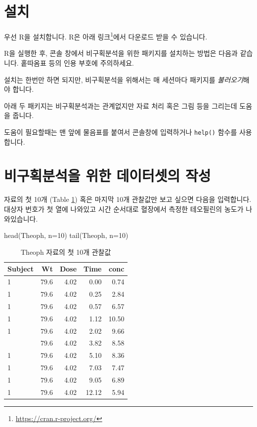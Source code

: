 \documentclass[
  11pt,
  krantz2, a4paper, twoside]{krantz}
\newenvironment{Shaded}{\begin{snugshade}}{\end{snugshade}}
\newcommand{\AttributeTok}[1]{\textcolor[rgb]{0.77,0.63,0.00}{#1}}
\newcommand{\DecValTok}[1]{\textcolor[rgb]{0.00,0.00,0.81}{#1}}
\newcommand{\FunctionTok}[1]{\textcolor[rgb]{0.00,0.00,0.00}{#1}}
\newcommand{\NormalTok}[1]{#1}
\begin{document}
\hypertarget{uxc124uxce58}{%
\section{설치}\label{uxc124uxce58}}

우선 R을 설치합니다.
R은 아래 링크\footnote{\url{https://cran.r-project.org/}}에서 다운로드 받을 수 있습니다.

R을 실행한 후, 콘솔 창에서 비구획분석을 위한 패키지를 설치하는 방법은 다음과 같습니다.
홑따옴표 등의 인용 부호에 주의하세요.

설치는 한번만 하면 되지만, 비구획분석을 위해서는 매 세션마다 패키지를 \emph{불러오기}해야 합니다.

아래 두 패키지는 비구획분석과는 관계없지만 자료 처리 혹은 그림 등을 그리는데 도움을 줍니다.

도움이 필요할때는 맨 앞에 물음표를 붙여서 콘솔창에 입력하거나 \texttt{help()} 함수를 사용합니다.

\hypertarget{uxbe44uxad6cuxd68duxbd84uxc11duxc744-uxc704uxd55c-uxb370uxc774uxd130uxc14buxc758-uxc791uxc131}{%
\section{비구획분석을 위한 데이터셋의 작성}\label{uxbe44uxad6cuxd68duxbd84uxc11duxc744-uxc704uxd55c-uxb370uxc774uxd130uxc14buxc758-uxc791uxc131}}

자료의 첫 10개 (Table \ref{tab:head}) 혹은 마지막 10개 관찰값만 보고 싶으면 다음을 입력합니다.
대상자 번호가 첫 열에 나와있고 시간 순서대로 혈장에서 측정한 테오필린의 농도가 나와있습니다.

\begin{Shaded}
\begin{Highlighting}[]
\FunctionTok{head}\NormalTok{(Theoph, }\AttributeTok{n=}\DecValTok{10}\NormalTok{)}
\FunctionTok{tail}\NormalTok{(Theoph, }\AttributeTok{n=}\DecValTok{10}\NormalTok{)}
\end{Highlighting}
\end{Shaded}

\begin{table}

\caption{\label{tab:head}Theoph 자료의 첫 10개 관찰값}
\centering
\begin{tabular}[t]{lrrrr}
\toprule
Subject & Wt & Dose & Time & conc\\
\midrule
1 & 79.6 & 4.02 & 0.00 & 0.74\\
1 & 79.6 & 4.02 & 0.25 & 2.84\\
1 & 79.6 & 4.02 & 0.57 & 6.57\\
1 & 79.6 & 4.02 & 1.12 & 10.50\\
1 & 79.6 & 4.02 & 2.02 & 9.66\\
\addlinespace
1 & 79.6 & 4.02 & 3.82 & 8.58\\
1 & 79.6 & 4.02 & 5.10 & 8.36\\
1 & 79.6 & 4.02 & 7.03 & 7.47\\
1 & 79.6 & 4.02 & 9.05 & 6.89\\
1 & 79.6 & 4.02 & 12.12 & 5.94\\
\bottomrule
\end{tabular}
\end{table}
\end{document}
